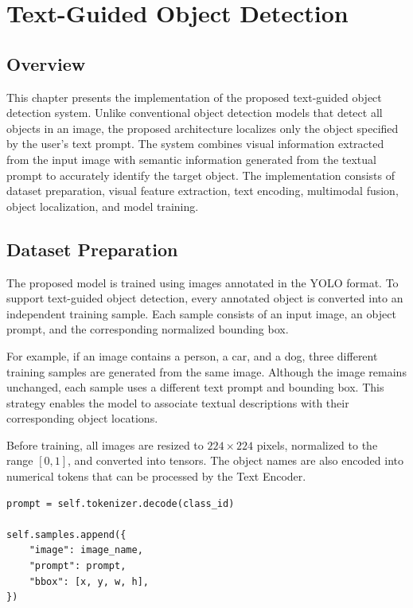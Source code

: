 \documentclass[a4paper,12pt]{report}
\begin{document}
\chapter*{Text-Guided Object Detection}
\label{chap:text-guided-detection}

\section{Overview}
\label{sec:tgod-overview}

This chapter presents the implementation of the proposed text-guided object
detection system. Unlike conventional object detection models that detect
all objects in an image, the proposed architecture localizes only the
object specified by the user's text prompt. The system combines visual
information extracted from the input image with semantic information
generated from the textual prompt to accurately identify the target
object. The implementation consists of dataset preparation, visual feature
extraction, text encoding, multimodal fusion, object localization, and
model training.

\section{Dataset Preparation}
\label{sec:tgod-dataset-preparation}

The proposed model is trained using images annotated in the YOLO format.
To support text-guided object detection, every annotated object is
converted into an independent training sample. Each sample consists of an
input image, an object prompt, and the corresponding normalized bounding
box.

For example, if an image contains a person, a car, and a dog, three
different training samples are generated from the same image. Although the
image remains unchanged, each sample uses a different text prompt and
bounding box. This strategy enables the model to associate textual
descriptions with their corresponding object locations.

Before training, all images are resized to $224 \times 224$ pixels,
normalized to the range $[0,1]$, and converted into tensors. The object
names are also encoded into numerical tokens that can be processed by the
Text Encoder.

\begin{lstlisting}[caption={Creating one training sample for each object}, label={lst:tgod-training-sample}]
prompt = self.tokenizer.decode(class_id)

self.samples.append({
    "image": image_name,
    "prompt": prompt,
    "bbox": [x, y, w, h],
})
\end{lstlisting}
\end{document}
